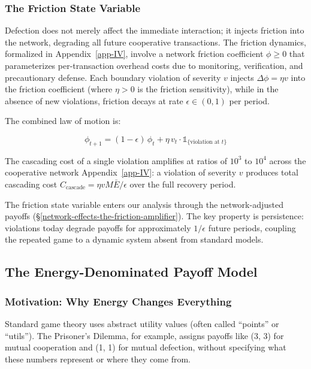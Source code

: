 \documentclass[11pt]{article}
\theoremstyle{plain}
\theoremstyle{definition}
\theoremstyle{remark}
\let\origsubsection\subsection
\renewcommand{\subsection}{\needspace{7\baselineskip}\origsubsection}
\let\origsubsubsection\subsubsection
\renewcommand{\subsubsection}{\needspace{4\baselineskip}\origsubsubsection}
\begin{document}
\subsubsection{The Friction State
Variable}\label{the-friction-state-variable}

Defection does not merely affect the immediate interaction; it injects
friction into the network, degrading all future cooperative
transactions. The friction dynamics, formalized in
Appendix~\ref{app-IV}, involve a network friction coefficient
\(\phi \geq 0\) that parameterizes per-transaction overhead costs due to
monitoring, verification, and precautionary defense. Each boundary
violation of severity \(v\) injects \(\Delta\phi = \eta v\) into the
friction coefficient (where \(\eta > 0\) is the friction sensitivity),
while in the absence of new violations, friction decays at rate
\(\epsilon \in (0,1)\) per period.

The combined law of motion is:

\[\phi_{t+1} = (1 - \epsilon)\,\phi_t + \eta\,v_t \cdot \mathds{1}_{\{\text{violation at } t\}}\]

The cascading cost of a single violation amplifies at ratios of \(10^3\)
to \(10^4\) across the cooperative network Appendix~\ref{app-IV}: a
violation of severity \(v\) produces total cascading cost
\(C_{\text{cascade}} = \eta v M \bar{E} / \epsilon\) over the full
recovery period.

The friction state variable enters our analysis through the
network-adjusted payoffs
(§\ref{network-effects-the-friction-amplifier}). The key property is
persistence: violations today degrade payoffs for approximately
\(1/\epsilon\) future periods, coupling the repeated game to a dynamic
system absent from standard models.

\subsection{The Energy-Denominated Payoff
Model}\label{the-energy-denominated-payoff-model}

\subsubsection{Motivation: Why Energy Changes
Everything}\label{motivation-why-energy-changes-everything}

Standard game theory uses abstract utility values (often called
``points'' or ``utils''). The Prisoner's Dilemma, for example, assigns
payoffs like (3, 3) for mutual cooperation and (1, 1) for mutual
defection, without specifying what these numbers represent or where they
come from.
\end{document}
